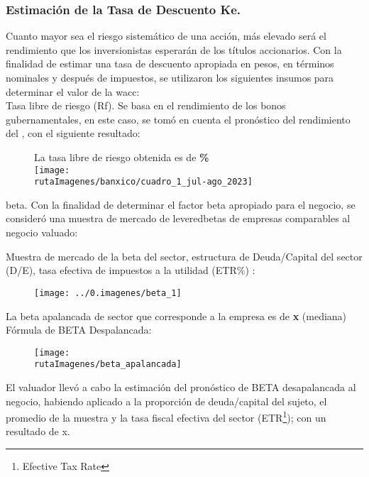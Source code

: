  \subsubsection{Estimaci\'on de la Tasa de Descuento Ke.}

Cuanto mayor sea el riesgo sistem\'atico de una acci\'on, m\'as elevado ser\'a el rendimiento que los inversionistas esperar\'an de los t\'itulos accionarios. Con la finalidad de estimar una tasa de descuento apropiada en pesos, en t\'erminos nominales y despu\'es de impuestos, se utilizaron los siguientes insumos para determinar el valor de la \gls{wacc}:\\


\textcolor{principal}{Tasa libre de riesgo (Rf).} Se basa en el rendimiento de los bonos gubernamentales, en este caso, se tom\'o en cuenta el pronóstico del rendimiento del \textcolor{principal}{\rfBase}, con el siguiente resultado:

\begin{figure}[H]
\centering
La tasa libre de riesgo obtenida es de \textbf{\rfValor\%}\\[10pt]
 \texttt{[image: \\rutaImagenes/banxico/cuadro\_1\_jul-ago\_2023]}
\end{figure}

\gls{beta}. Con la finalidad de determinar el factor \gls{beta} apropiado para el negocio, se consider\'o una muestra de mercado de \glspl{leveredbeta} de empresas comparables al negocio valuado:

\textcolor{principal}{Muestra de mercado de la beta del sector,  estructura de Deuda/Capital del sector (D/E), tasa efectiva de impuestos a la utilidad (ETR\%) :}

\espacio{4cm}
\begin{figure}[H]
\centering
\texttt{[image: ../0.imagenes/beta\_1]}\\
\end{figure}

La beta apalancada de sector que corresponde a la empresa es de \textcolor{principal}{\textbf{\valorBeta x }(mediana)}\\

F\'ormula de BETA Despalancada:
\begin{figure}[H]
\centering
\texttt{[image: \\rutaImagenes/beta\_apalancada]}
\end{figure}

El valuador llev\'o a cabo la estimaci\'on del pron\'ostico de BETA desapalancada al negocio, habiendo aplicado a la proporci\'on de deuda/capital del sujeto, el promedio de la muestra y la tasa fiscal efectiva del sector (ETR\footnote{Efective Tax Rate}); con un resultado de \textcolor{principal}{\betaDesapalancada x}.\\

